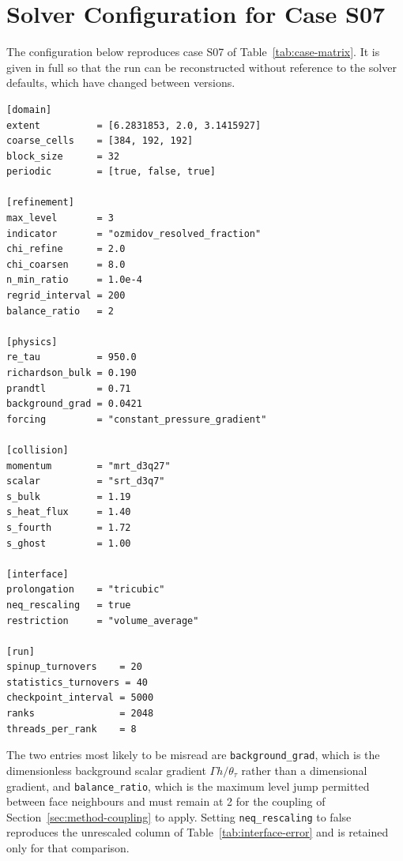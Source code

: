 \chapter{Solver Configuration for Case S07}
\label{app:configuration}

The configuration below reproduces case S07 of Table~\ref{tab:case-matrix}. It
is given in full so that the run can be reconstructed without reference to the
solver defaults, which have changed between versions.

\begin{lstlisting}[caption={Production configuration for case S07.},label={lst:s07}]
[domain]
extent          = [6.2831853, 2.0, 3.1415927]
coarse_cells    = [384, 192, 192]
block_size      = 32
periodic        = [true, false, true]

[refinement]
max_level       = 3
indicator       = "ozmidov_resolved_fraction"
chi_refine      = 2.0
chi_coarsen     = 8.0
n_min_ratio     = 1.0e-4
regrid_interval = 200
balance_ratio   = 2

[physics]
re_tau          = 950.0
richardson_bulk = 0.190
prandtl         = 0.71
background_grad = 0.0421
forcing         = "constant_pressure_gradient"

[collision]
momentum        = "mrt_d3q27"
scalar          = "srt_d3q7"
s_bulk          = 1.19
s_heat_flux     = 1.40
s_fourth        = 1.72
s_ghost         = 1.00

[interface]
prolongation    = "tricubic"
neq_rescaling   = true
restriction     = "volume_average"

[run]
spinup_turnovers    = 20
statistics_turnovers = 40
checkpoint_interval = 5000
ranks               = 2048
threads_per_rank    = 8
\end{lstlisting}

The two entries most likely to be misread are \texttt{background\_grad}, which
is the dimensionless background scalar gradient $\Gamma h / \theta_\tau$ rather
than a dimensional gradient, and \texttt{balance\_ratio}, which is the maximum
level jump permitted between face neighbours and must remain at 2 for the
coupling of Section~\ref{sec:method-coupling} to apply. Setting
\texttt{neq\_rescaling} to false reproduces the unrescaled column of
Table~\ref{tab:interface-error} and is retained only for that comparison.
